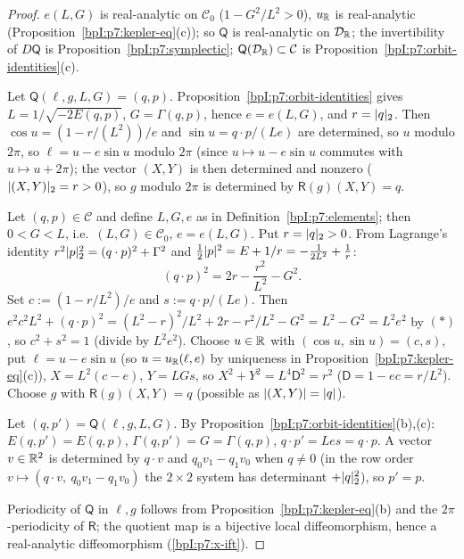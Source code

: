 \begin{proof}
\label{stepI:p7:ch-reg} $e(L,G)$ is real-analytic on $\mathcal C_0$ ($1-G^2/L^2>0$), $u_{\mathbb{R}}$ is real-analytic (Proposition~\ref{bpI:p7:kepler-eq}(c)); so $\mathsf Q$ is real-analytic on $\mathcal D_{\mathbb{R}}$; the invertibility of $D\mathsf Q$ is Proposition~\ref{bpI:p7:symplectic}; $\mathsf Q(\mathcal D_{\mathbb{R}})\subset\mathcal C$ is Proposition~\ref{bpI:p7:orbit-identities}(c).

\label{stepI:p7:ch-inj} Let $\mathsf Q(\ell,g,L,G)=(q,p)$. Proposition~\ref{bpI:p7:orbit-identities} gives $L=1/\sqrt{-2E(q,p)}$, $G=\Gamma(q,p)$, hence $e=e(L,G)$, and $r=\lvert q\rvert_2$. Then $\cos u=(1-r/(L^2))/e$ and $\sin u=q\cdot p/(Le)$ are determined, so $u$ modulo $2\pi$, so $\ell=u-e\sin u$ modulo $2\pi$ (since $u\mapsto u-e\sin u$ commutes with $u\mapsto u+2\pi$); the vector $(X,Y)$ is then determined and nonzero ($\lvert (X,Y)\rvert_2=r>0$), so $g$ modulo $2\pi$ is determined by $\mathsf R(g)(X,Y)=q$.

\label{stepI:p7:ch-surj1} Let $(q,p)\in\mathcal C$ and define $L,G,e$ as in Definition~\ref{bpI:p7:elements}; then $0<G<L$, i.e.\ $(L,G)\in\mathcal C_0$, $e=e(L,G)$. Put $r=\lvert q\rvert_2>0$. From Lagrange's identity $r^2\lvert p\rvert_2^2=(q\cdot p)^2+\Gamma^2$ and $\tfrac12\lvert p\rvert^2=E+1/r=-\tfrac1{2L^2}+\tfrac1r$:
\[
(q\cdot p)^2=2r-\frac{r^2}{L^2}-G^2.\tag{$*$}
\]
\label{stepI:p7:ch-surj2} Set $c:=(1-r/L^2)/e$ and $s:=q\cdot p/(Le)$. Then $e^2c^2L^2+(q\cdot p)^2=(L^2-r)^2/L^2+2r-r^2/L^2-G^2=L^2-G^2=L^2e^2$ by $(*)$, so $c^2+s^2=1$ (divide by $L^2e^2$). Choose $u\in\mathbb{R}$ with $(\cos u,\sin u)=(c,s)$, put $\ell=u-e\sin u$ (so $u=u_{\mathbb{R}}(\ell,e)$ by uniqueness in Proposition~\ref{bpI:p7:kepler-eq}(c)), $X=L^2(c-e)$, $Y=LGs$, so $X^2+Y^2=L^4\mathsf D^2=r^2$ ($\mathsf D=1-ec=r/L^2$). Choose $g$ with $\mathsf R(g)(X,Y)=q$ (possible as $\lvert (X,Y)\rvert=\lvert q\rvert$).

\label{stepI:p7:ch-surj3} Let $(q,p')=\mathsf Q(\ell,g,L,G)$. By Proposition~\ref{bpI:p7:orbit-identities}(b),(c): $E(q,p')=E(q,p)$, $\Gamma(q,p')=G=\Gamma(q,p)$, $q\cdot p'=Les=q\cdot p$. A vector $v\in\mathbb{R}^2$ is determined by $q\cdot v$ and $q_0v_1-q_1v_0$ when $q\ne0$ (in the row order $v\mapsto(q\cdot v,\ q_0v_1-q_1v_0)$ the $2\times2$ system has determinant $+\lvert q\rvert_2^2$), so $p'=p$.

\label{stepI:p7:ch-diffeo} Periodicity of $\mathsf Q$ in $\ell,g$ follows from Proposition~\ref{bpI:p7:kepler-eq}(b) and the $2\pi$-periodicity of $\mathsf R$; the quotient map is a bijective local diffeomorphism, hence a real-analytic diffeomorphism (\ref{bpI:p7:x-ift}).
\end{proof}

